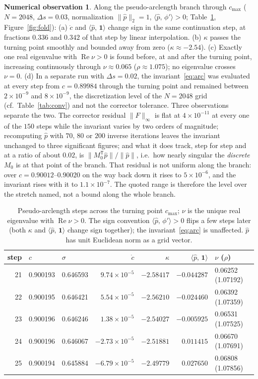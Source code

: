 \documentclass[11pt]{article}
\theoremstyle{plain}
\theoremstyle{definition}
\newtheorem{observation}[theorem]{Numerical observation}
\theoremstyle{remark}
\newcommand{\ip}[2]{\langle #1,\,#2\rangle}
\newcommand{\ph}{\hat p}
\newcommand{\one}{\mathbf 1}
\newcommand{\T}{\mathsf T}
\newcommand{\cmax}{c_{\max}}
\begin{document}
\begin{observation}\label{obs:fold}
Along the pseudo-arclength branch through $\cmax$ ($N=2048$, $\Delta s=0.03$,
normalization $\|\ph\|_2=1$, $\ip{\ph}{\phi'}>0$; Table~\ref{tab:fold}, Figure~\ref{fig:fold}):
(a) $\dot c$ and $\ip{\ph}{\one}$ change sign in the same continuation step, at fractions
$0.336$ and $0.342$ of that step by linear interpolation. (b) $\kappa$ passes the turning
point smoothly and bounded away from zero ($\kappa\approx-2.54$). (c) Exactly one real
eigenvalue with $\operatorname{Re}\nu>0$ is found before, at and after the turning point,
increasing continuously through $\nu\approx0.065$ ($\rho\approx1.075$); no eigenvalue crosses
$\nu=0$. (d) In a separate run with $\Delta s=0.02$, the invariant~\eqref{eq:arc} was evaluated
at every step from $c=0.89984$ through the turning point and remained between
$2\times10^{-9}$ and $8\times10^{-9}$, the discretization level of the $N=2048$ grid
(cf.\ Table~\ref{tab:conv}) and not the corrector tolerance. Three observations separate the
two. The corrector residual $\|F\|_\infty$ is flat at $4\times10^{-11}$ at every one of the
$150$ steps while the invariant varies by two orders of magnitude; recomputing $\ph$ with
$70$, $80$ or $200$ inverse iterations leaves the invariant unchanged to three significant
figures; and what it does track, step for step and at a ratio of about $0.02$, is
$\|M_0^{\T}\ph\|/\|\ph\|$, i.e.\ how nearly singular the \emph{discrete} $M_0$ is at that
point of the branch. That residual is not uniform along the branch: over
$c=0.90012$--$0.90020$ on the way back down it rises to $5\times10^{-6}$, and the invariant
rises with it to $1.1\times10^{-7}$. The quoted range is therefore the level over the
stretch named, not a bound along the whole branch.
\end{observation}

\begin{table}[h]
\centering\small
\caption{Pseudo-arclength steps across the turning point $\cmax$; $\nu$ is the unique real
eigenvalue with $\operatorname{Re}\nu>0$. The sign convention $\ip{\ph}{\phi'}>0$ flips a
few steps later (both $\kappa$ and $\ip{\ph}{\one}$ change sign together); the
invariant~\eqref{eq:arc} is unaffected. $\ph$ has unit Euclidean norm as a grid vector.}
\label{tab:fold}
\begin{tabular}{@{}rllrrrl@{}}
\toprule
step & $c$ & $\sigma$ & $\dot c$ & $\kappa$ & $\ip{\ph}{\one}$ & $\nu$ ($\rho$)\\
\midrule
21 & 0.900193 & 0.646593 & $ 9.74\times10^{-5}$ & $-2.58417$ & $-0.044287$ & 0.06252 (1.07192)\\
22 & 0.900195 & 0.646421 & $ 5.54\times10^{-5}$ & $-2.56210$ & $-0.024460$ & 0.06392 (1.07359)\\
23 & 0.900196 & 0.646246 & $ 1.38\times10^{-5}$ & $-2.54027$ & $-0.005925$ & 0.06531 (1.07525)\\
24 & 0.900196 & 0.646067 & $-2.73\times10^{-5}$ & $-2.51881$ & $ 0.011415$ & 0.06670 (1.07691)\\
25 & 0.900194 & 0.645884 & $-6.79\times10^{-5}$ & $-2.49779$ & $ 0.027650$ & 0.06808 (1.07856)\\
\bottomrule
\end{tabular}
\end{table}
\end{document}
